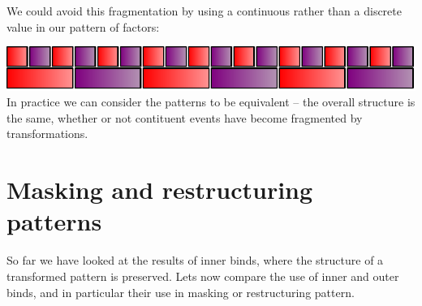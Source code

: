 We could avoid this fragmentation by using a continuous rather than a
discrete value in our pattern of factors:

\begin{Shaded}
\begin{Highlighting}[]
\OtherTok{{-}\textgreater{}} 
\OtherTok{=}  \OperatorTok{$}\OtherTok{{-}\textgreater{}}\NormalTok{ [} \NormalTok{ ts v]}

\OtherTok{=}\NormalTok{ stack [fast (hold }
\NormalTok{              ]}
    \OtherTok{=}
\end{Highlighting}
\end{Shaded}

\includegraphics{../figures/fig5b.pdf}\\

In practice we can consider the patterns to be equivalent -- the overall
structure is the same, whether or not contituent events have become
fragmented by transformations.

\section{Masking and restructuring
patterns}\label{masking-and-restructuring-patterns}

So far we have looked at the results of inner binds, where the structure
of a transformed pattern is preserved. Lets now compare the use of inner
and outer binds, and in particular their use in masking or restructuring
pattern.

